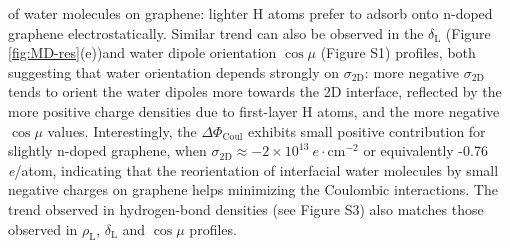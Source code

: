 \documentclass[journal=langd5,manuscript=article,email=true,hyperref=true,keywords=true]{achemso}
\begin{document}
of water molecules on graphene: lighter H atoms prefer to adsorb onto
n-doped graphene electrostatically. Similar trend can also be observed
in the \(\delta_{\mathrm{L}}\) (Figure \ref{fig:MD-res}(e))and water
dipole orientation \(\cos \mu\) (Figure S1) profiles, both
suggesting that water orientation depends strongly on
\(\sigma_{\mathrm{2D}}\): more negative \(\sigma_{\mathrm{2D}}\) tends
to orient the water dipoles more towards the 2D interface, reflected
by the more positive charge densities due to first-layer H atoms, and
the more negative \(\cos \mu\) values. Interestingly, the \(\Delta
\Phi_{\mathrm{Coul}}\) exhibits small positive contribution for slightly
n-doped graphene, when \(\sigma_{\mathrm{2D}} \approx -2\times10^{13}\
e\cdot \mathrm{cm}^{-2}\) or equivalently -0.76 \textit{e}/atom,
indicating that the reorientation of interfacial water molecules by
small negative charges on graphene helps minimizing the Coulombic
interactions. The trend observed in hydrogen-bond densities (see
Figure S3) also matches those observed in \(\rho_{\mathrm{L}}\),
\(\delta_{\mathrm{L}}\) and \(\cos \mu\) profiles.
\end{document}

